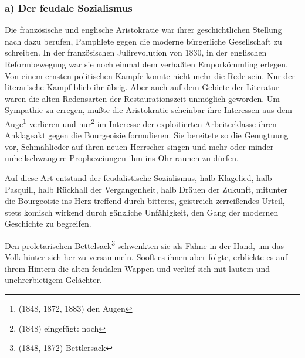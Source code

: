 \documentclass[letterpaper]{article}
\begin{document}
\subsubsection{a) Der feudale Sozialismus}

Die französische und englische Aristokratie war ihrer geschichtlichen Stellung nach dazu berufen, Pamphlete gegen die moderne bürgerliche Gesellschaft zu schreiben. In der französischen Julirevolution von 1830, in der englischen Reformbewegung war sie noch einmal dem verhaßten Emporkömmling erlegen. Von einem ernsten politischen Kampfe konnte nicht mehr die Rede sein. Nur der literarische Kampf blieb ihr übrig. Aber auch auf dem Gebiete der Literatur waren die alten Redensarten der Restaurationszeit unmöglich geworden. Um Sympathie zu erregen, mußte die Aristokratie scheinbar ihre Interessen aus dem Auge\footnote{(1848, 1872, 1883) den Augen} verlieren und nur\footnote{(1848) eingefügt: noch} im Interesse der exploitierten Arbeiterklasse ihren Anklageakt gegen die Bourgeoisie formulieren. Sie bereitete so die Genugtuung vor, Schmählieder auf ihren neuen Herrscher singen und mehr oder minder unheilschwangere Prophezeiungen ihm ins Ohr raunen zu dürfen.

Auf diese Art entstand der feudalistische Sozialismus, halb Klagelied, halb Pasquill, halb Rückhall der Vergangenheit, halb Dräuen der Zukunft, mitunter die Bourgeoisie ins Herz treffend durch bitteres, geistreich zerreißendes Urteil, stets komisch wirkend durch gänzliche Unfähigkeit, den Gang der modernen Geschichte zu begreifen.

Den proletarischen Bettelsack\footnote{(1848, 1872) Bettlersack} schwenkten sie als Fahne in der Hand, um das Volk hinter sich her zu versammeln. Sooft es ihnen aber folgte, erblickte es auf ihrem Hintern die alten feudalen Wappen und verlief sich mit lautem und unehrerbietigem Gelächter.
\end{document}
